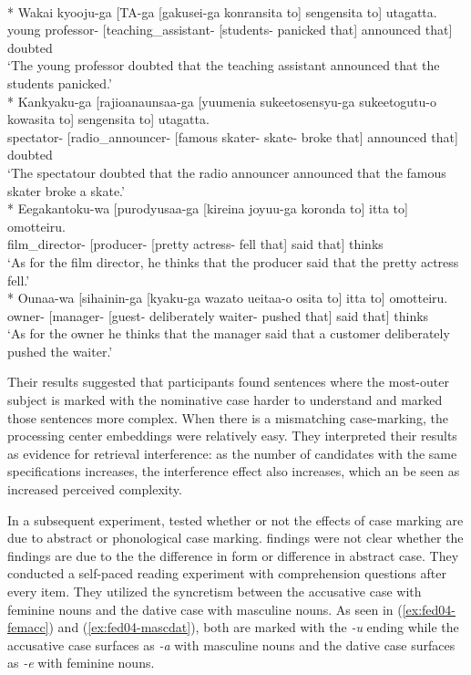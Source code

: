 \ea \label{ex:baby99}
   \\*
  \gll Wakai kyooju-{ga} [TA-ga [gakusei-ga konransita to] sengensita to] utagatta.\\
  young professor-{\Nom{}} [teaching\_assistant-\Nom{} [students-\Nom{} panicked that] announced that] doubted\\
  \glt `The young professor doubted that the teaching assistant announced that the students panicked.'
  \\*
  \gll Kankyaku-{ga} [rajioanaunsaa-ga [yuumenia sukeetosensyu-ga sukeetogutu-o kowasita to] sengensita to] utagatta.\\
  spectator-{\Nom{}} [radio\_announcer-\Nom{} [famous skater-\Nom{} skate-\Acc{} broke that] announced that] doubted\\
  \glt `The spectatour doubted that the radio announcer announced that the famous skater broke a skate.'
  \\*
  \gll Eegakantoku-{wa} [purodyusaa-ga [kireina joyuu-ga koronda to] itta to] omotteiru.\\
  film\_director-{\Top{}} [producer-\Nom{} [pretty actress-\Nom{} fell that] said that] thinks\\
  \glt `As for the film director, he thinks that the producer said that the pretty actress fell.'
  \\*
  \gll Ounaa-{wa} [sihainin-ga [kyaku-ga wazato ueitaa-o osita to] itta to] omotteiru.\\
  owner-{\Top{}} [manager-\Nom{} [guest-\Nom{} deliberately waiter-\Acc{} pushed that] said that] thinks\\
  \glt `As for the owner he thinks that the manager said that a customer deliberately pushed the waiter.'
  \z
\z

Their results suggested that participants found sentences where the most-outer subject is marked with the nominative case harder to understand and marked those sentences more complex. When there is a mismatching case-marking, the processing center embeddings were relatively easy. They interpreted their results as evidence for retrieval interference: as the number of candidates with the same specifications increases, the interference effect also increases, which an be seen as increased perceived complexity. 

In a subsequent experiment,  tested whether or not the effects of case marking are due to abstract or phonological case marking. \cites{BabyGibson99} findings were not clear whether the findings are due to the the difference in form or difference in abstract case. They conducted a self-paced reading experiment with comprehension questions after every item. They utilized the syncretism between the accusative case with feminine nouns and the dative case with masculine nouns. As seen in (\ref{ex:fed04-femacc}) and (\ref{ex:fed04-mascdat}), both are marked with the \emph{-u} ending while the accusative case surfaces as \emph{-a} with masculine nouns and the dative case surfaces as \emph{-e} with feminine nouns.

